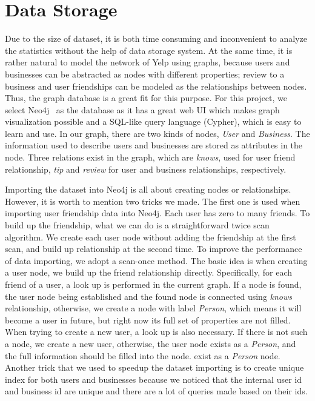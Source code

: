 \documentclass[11pt, oneside]{article}   	%
\begin{document}
\section{Data Storage}
Due to the size of dataset, it is both time consuming and inconvenient to analyze the statistics without the help of data storage 
system. At the same time, it is rather natural to model the network of Yelp using graphs, because users and businesses can be
abstracted as nodes with different properties; review to a business and user friendships can be modeled as the relationships 
between nodes. Thus, the graph database is a great fit for this purpose. For this project, we select Neo4j~\cite{neo4j} as the
database as it has a great web UI which makes graph visualization possible and a SQL-like query language (Cypher), which is easy 
to learn and use. In our graph, there are two kinds of nodes, \textit{User} and \textit{Business}. 
The information used to describe users and businesses are stored as attributes in the node. Three relations exist in 
the graph, which are \textit{knows}, used for user friend relationship, \textit{tip} and \textit{review} for user and business 
relationships, respectively. 

Importing the dataset into Neo4j is all about creating nodes or relationships. However, it is worth to mention two tricks we 
made. The first one is used when importing user friendship data into Neo4j. Each user has zero to many friends. To build up 
the friendship, what we can do is a straightforward twice scan algorithm. We create each user node without adding the 
friendship at the first scan, and build up relationship at the second time. To improve the performance of data importing, we 
adopt a scan-once method. The basic idea is when creating a user node, we build up the friend relationship directly. 
Specifically, for each friend of a user, a look up is performed in the current graph. 
If a node is found, the user node being established and the found node is connected using \textit{knows} relationship, 
otherwise, we create a node with label \textit{Person}, which means it will become a user in future, but right now its full 
set of properties are not filled.  When trying to create a new user, a look up is also necessary. If there is not such a node, 
we create a new user, otherwise, the user node exists as a \textit{Person}, and the full information should be filled into the node. 
exist as a \textit{Person} node. Another trick that we used to speedup the dataset importing is to create unique index 
for both users and businesses because we noticed that the internal user id and business id are unique and there are 
a lot of queries made based on their ids.
  
\end{document}
